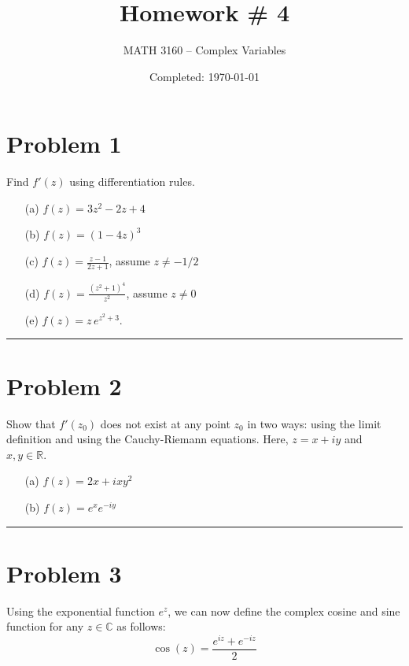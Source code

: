 \documentclass{article}
\title{Homework \# 4}
\author{
	MATH 3160 -- Complex Variables\\
	\myauthor
}
\date{Completed: \today}
\begin{document}
\maketitle %


\section*{Problem 1}
Find $f'(z)$ using differentiation rules.
\begin{enumerate}
	\item[(a)]  $f(z) = 3z^2-2z+4$
	\item[(b)] $f(z) = (1-4z)^3$
	\item[(c)] $f(z) = \frac{z-1}{2z+1}$, assume $z\neq -1/2$
	\item[(d)] $f(z) = \frac{(z^2+1)^4}{z^2}$, assume $z\neq 0$
	\item[(e)] $f(z) = z \, e^{z^2 + 3}$.
\end{enumerate}


\vspace{.5cm} %

\hrule %

\newpage
\section*{Problem 2}
Show that $f'(z_0)$ does not exist at any point $z_0$ in two ways: using the limit definition and using the Cauchy-Riemann equations. Here, $z = x + iy$ and $x,y \in \mathbb{R}$.
		\begin{enumerate}
			\item[(a)] $f(z) = 2x+ixy^2$
			\item[(b)] $f(z) = e^{x}e^{-iy}$
		\end{enumerate}
	

\vspace{.5cm} %

\hrule

\newpage
\section*{Problem 3}
Using the exponential function $e^{z}$, we can now define the complex cosine and sine function for any $z \in \mathbb{C}$ as follows:
		\[  \cos(z) = \frac{e^{iz} + e^{-iz}}{2} \]
		
\end{document}
